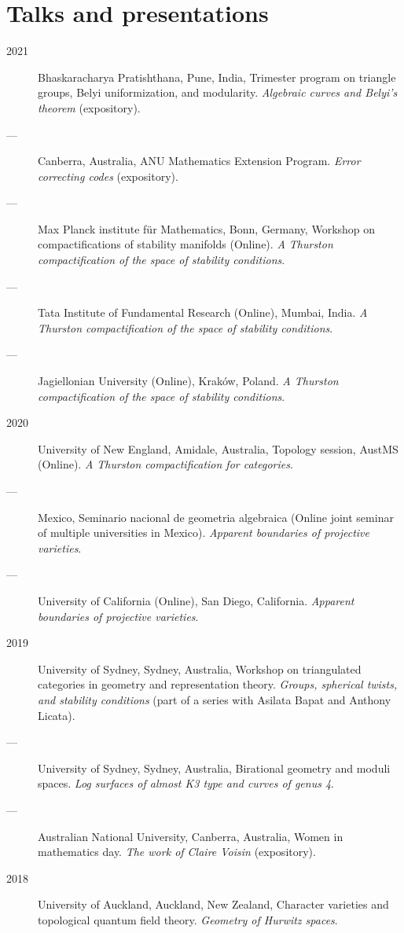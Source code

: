 \documentclass[11pt]{article}
\begin{document}
\section*{Talks and presentations}
\label{sec:orga58a071}
\begin{description}
\item[{2021}] Bhaskaracharya Pratishthana, Pune, India, Trimester program on triangle groups, Belyi uniformization, and modularity. \emph{Algebraic curves and Belyi's theorem} (expository).
\item[{---}] Canberra, Australia, ANU Mathematics Extension Program. \emph{Error correcting codes} (expository).
\item[{---}] Max Planck institute für Mathematics, Bonn, Germany, Workshop on compactifications of stability manifolds (Online). \emph{A Thurston compactification of the space of stability conditions}.
\item[{---}] Tata Institute of Fundamental Research (Online), Mumbai, India. \emph{A Thurston compactification of the space of stability conditions}.
\item[{---}] Jagiellonian University (Online), Kraków, Poland. \emph{A Thurston compactification of the space of stability conditions}.
\item[{2020}] University of New England, Amidale, Australia, Topology session, AustMS (Online). \emph{A Thurston compactification for categories}.
\item[{---}] Mexico, Seminario nacional de geometria algebraica (Online joint seminar of multiple universities in Mexico). \emph{Apparent boundaries of projective varieties}.
\item[{---}] University of California (Online), San Diego, California. \emph{Apparent boundaries of projective varieties}.
\item[{2019}] University of Sydney, Sydney, Australia, Workshop on triangulated categories in geometry and representation theory. \emph{Groups, spherical twists, and stability conditions} (part of a series with Asilata Bapat and Anthony Licata).
\item[{---}] University of Sydney, Sydney, Australia, Birational geometry and moduli spaces. \emph{Log surfaces of almost K3 type and curves of genus 4}.
\item[{---}] Australian National University, Canberra, Australia, Women in mathematics day. \emph{The work of Claire Voisin} (expository).
\item[{2018}] University of Auckland, Auckland, New Zealand, Character varieties and topological quantum field theory. \emph{Geometry of Hurwitz spaces}.

\end{description}
\end{document}
